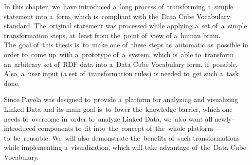 In this chapter, we~have introduced a~long process of~transforming a~simple statement into
a~form, which is~compliant with the~Data Cube Vocabulary standard. The~original statement
was processed while applying a~set of~a~simple transformation steps, at~least from the~point of~view
of a~human brain. The~goal of~this thesis is~to~make one of~these steps as~automatic as~possible 
in order to~come up~with a~prototype of~a~system, which is~able to~transform an~arbitrary set of~RDF data
into a~Data Cube Vocabulary form, if~possible. Also, a~user input (a set of~transformation rules) is
needed to~get such a~task done. 

Since Payola was designed to~provide a~platform for analyzing and visualizing 
Linked Data and its main goal is~to~lower the~knowledge barrier, which one needs to~overcome in~order to~analyze Linked Data, we~also want all newly--introduced 
components to~fit into~the~concept of~the~whole platform --- to~be~reusable. We~will also demonstrate the~benefits of~such transformations while implementing 
a~visualization, which will take advantage of~the~Data Cube Vocabulary.
